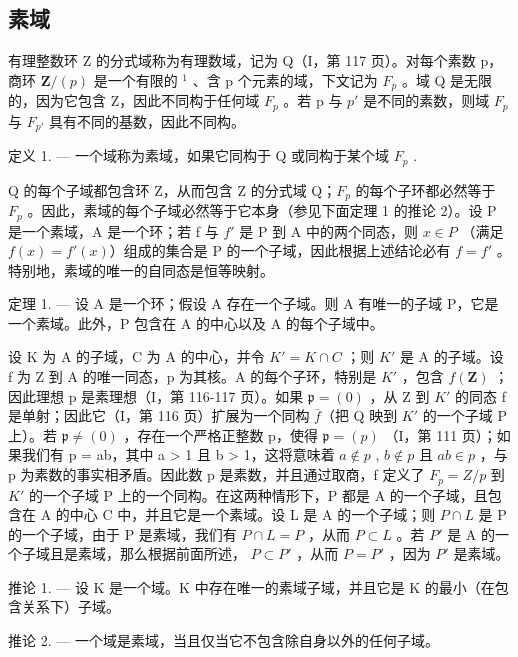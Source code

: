 \subsection{素域}

有理整数环 Z 的分式域称为有理数域，记为 Q（I，第 117 页）。对每个素数 p，商环 \(\mathbf{Z}/(p)\) 是一个有限的 \(^{1}\) 、含 p 个元素的域，下文记为 \(F_{p}\) 。域 Q 是无限的，因为它包含 Z，因此不同构于任何域 \(F_{p}\) 。若 p 与 \(p'\) 是不同的素数，则域 \(F_{p}\) 与 \(F_{p'}\) 具有不同的基数，因此不同构。

定义 1. --- 一个域称为素域，如果它同构于 Q 或同构于某个域 \(F_{p}\) .

Q 的每个子域都包含环 Z，从而包含 Z 的分式域 Q；\(F_{p}\) 的每个子环都必然等于 \(F_{p}\) 。因此，素域的每个子域必然等于它本身（参见下面定理 1 的推论 2）。设 P 是一个素域，A 是一个环；若 f 与 \(f'\) 是 P 到 A 中的两个同态，则 \(x \in P\) （满足 \(f(x) = f'(x)\)）组成的集合是 P 的一个子域，因此根据上述结论必有 \(f = f'\) 。特别地，素域的唯一的自同态是恒等映射。

定理 1. --- 设 A 是一个环；假设 A 存在一个子域。则 A 有唯一的子域 P，它是一个素域。此外，P 包含在 A 的中心以及 A 的每个子域中。

设 K 为 A 的子域，C 为 A 的中心，并令 \(K' = K \cap C\) ；则 \(K'\) 是 A 的子域。设 f 为 Z 到 A 的唯一同态，p 为其核。A 的每个子环，特别是 \(K'\) ，包含 \(f(\mathbf{Z})\) ；因此理想 p 是素理想（I，第 116-117 页）。如果 \(\mathfrak{p} = (0)\) ，从 Z 到 \(K'\) 的同态 f 是单射；因此它（I，第 116 页）扩展为一个同构 \(\bar{f}\)（把 Q 映到 \(K'\) 的一个子域 P 上）。若 \(\mathfrak{p} \neq (0)\) ，存在一个严格正整数 p，使得 \(\mathfrak{p} = (p)\) （I，第 111 页）；如果我们有 p = ab，其中 a \textgreater{} 1 且 b \textgreater{} 1，这将意味着 \(a \notin p\) , \(b \notin p\) 且 \(ab \in p\) ，与 p 为素数的事实相矛盾。因此数 p 是素数，并且通过取商，f 定义了 \(F_p = Z/p\) 到 \(K'\) 的一个子域 P 上的一个同构。在这两种情形下，P 都是 A 的一个子域，且包含在 A 的中心 C 中，并且它是一个素域。设 L 是 A 的一个子域；则 \(P \cap L\) 是 P 的一个子域，由于 P 是素域，我们有 \(P \cap L = P\) ，从而 \(P \subset L\) 。若 \(P'\) 是 A 的一个子域且是素域，那么根据前面所述， \(P \subset P'\) ，从而 \(P = P'\) ，因为 \(P'\) 是素域。

推论 1. --- 设 K 是一个域。K 中存在唯一的素域子域，并且它是 K 的最小（在包含关系下）子域。

推论 2. --- 一个域是素域，当且仅当它不包含除自身以外的任何子域。

